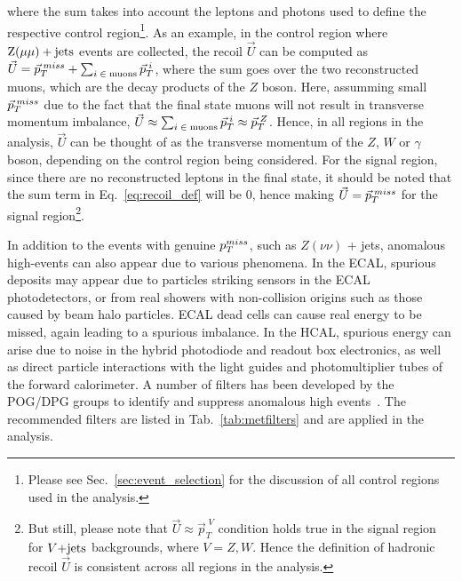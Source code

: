 where the sum takes into account the leptons and photons used to define the respective control 
region\footnote{Please see Sec.~\ref{sec:event_selection} for the discussion of all control regions
used in the analysis.}.
As an example, in the control region where $\mathrm{Z}(\mu\mu)+\textrm{jets}$ events are collected, the recoil $\vec{U}$ can be
computed as $\vec{U} = \vec{p}_{T}^{\;miss} + \sum_{i\;\in\;\textrm{muons}} \vec{p}_{T}^{\;i}$, where the sum goes over
the two reconstructed muons, which are the decay products of the $Z$ boson. Here, assumming small $\vec{p}_{T}^{\;miss}$
due to the fact that the final state muons will not result in transverse momentum imbalance, 
$\vec{U} \approx \sum_{i\;\in\;\textrm{muons}} \vec{p}_{T}^{\;i} \approx \vec{p}_T^{\;Z}$. Hence,
in all regions in the analysis, $\vec{U}$ can be thought of as the transverse momentum of the $Z$, $W$ or $\gamma$ 
boson, depending on the control region being considered.
For the signal region, 
since there are no reconstructed leptons in the final state, it should be noted that the sum term
in Eq.~\ref{eq:recoil_def} will be $0$, hence making $\vec{U} = \vec{p}_{T}^{\;miss}$ for the signal 
region\footnote{But still, please note that $\vec{U} \approx \vec{p}_T^{\;V}$ condition holds true in the
signal region for $V\text{+jets}$ backgrounds, where $V = Z, W$. Hence the definition of hadronic recoil $\vec{U}$ is consistent
across all regions in the analysis.}.


In addition to the events with genuine $p_T^{miss}$, such as $Z(\nu\nu)$ + jets, 
anomalous high-\ptmiss events can also appear due to various phenomena.
In the ECAL, spurious deposits may appear due to particles striking
sensors in the ECAL photodetectors, or from real showers with non-collision
origins such as those caused by beam halo particles. ECAL dead cells can cause real
energy to be missed, again leading to a spurious imbalance.
In the HCAL, spurious energy can arise due to  noise in the hybrid
photodiode and readout box  electronics, as well as
direct particle interactions with  the light guides and
photomultiplier tubes of the forward calorimeter. 
A number of filters has been developed by the POG/DPG groups to identify and suppress anomalous high
\ptmiss events~\cite{CMS-JME-TWIKI-FILTER}. The recommended filters are listed in Tab.~\ref{tab:metfilters} and are applied in the analysis.

